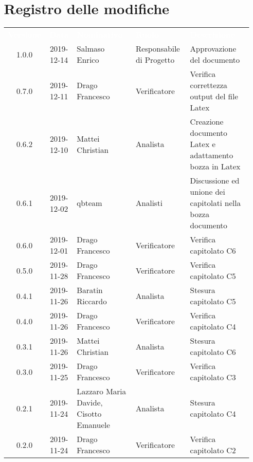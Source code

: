 \section*{Registro delle modifiche}
{
\renewcommand{\arraystretch}{1.5}
\centering
\begin{longtable}{ c c  C{4cm}  C{3cm} C{4cm}}
\textcolor{white}{\textbf{Versione}} & \textcolor{white}{\textbf{Data}} & \textcolor{white}{\textbf{Nominativo}} & \textcolor{white}{\textbf{Ruolo}} & \textcolor{white}{\textbf{Descrizione}}\\	

1.0.0 & 2019-12-14 & Salmaso Enrico & Responsabile di Progetto & Approvazione del documento \\	

0.7.0 & 2019-12-11 & Drago Francesco & Verificatore & Verifica correttezza output del file Latex \\

0.6.2 & 2019-12-10 & Mattei Christian & Analista & Creazione documento Latex e adattamento bozza in Latex \\

0.6.1 & 2019-12-02 & qbteam & Analisti & Discussione ed unione dei capitolati nella bozza documento \\

0.6.0 & 2019-12-01 & Drago Francesco & Verificatore & Verifica capitolato C6 \\

0.5.0 & 2019-11-28 & Drago Francesco & Verificatore & Verifica capitolato C5 \\

0.4.1 & 2019-11-26 & Baratin Riccardo & Analista & Stesura capitolato C5 \\

0.4.0 & 2019-11-26 & Drago Francesco & Verificatore & Verifica capitolato C4 \\

0.3.1 & 2019-11-26 & Mattei Christian & Analista & Stesura capitolato C6 \\

0.3.0 & 2019-11-25 & Drago Francesco & Verificatore & Verifica capitolato C3 \\

0.2.1 & 2019-11-24 & Lazzaro Maria Davide, Cisotto Emanuele & Analista & Stesura capitolato C4 \\

0.2.0 & 2019-11-24 & Drago Francesco & Verificatore & Verifica capitolato C2 \\


\end{longtable}}
